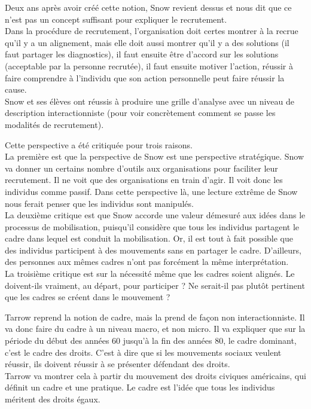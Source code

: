 \documentclass[10pt, a4paper, openany]{book}
\begin{document}
Deux ans après avoir créé cette notion, Snow revient dessus et nous dit que ce n'est pas un concept suffisant pour expliquer le recrutement. \\
Dans la procédure de recrutement, l'organisation doit certes montrer à la recrue qu'il y a un alignement, mais elle doit aussi montrer qu'il y a des solutions (il faut partager les diagnostics), il faut ensuite être d'accord sur les solutions (acceptable par la personne recrutée), il faut ensuite motiver l'action, réussir à faire comprendre à l'individu que son action personnelle peut faire réussir la cause. \\
Snow et ses élèves ont réussis à produire une grille d'analyse avec un niveau de description interactionniste (pour voir concrètement comment se passe les modalités de recrutement).


Cette perspective a été critiquée pour trois raisons. \\
La première est que la perspective de Snow est une perspective stratégique. Snow va donner un certains nombre d'outils aux organisations pour faciliter leur recrutement. Il ne voit que des organisations en train d'agir. Il voit donc les individus comme passif. Dans cette perspective là, une lecture extrême de Snow nous ferait penser que les individus sont manipulés. \\
La deuxième critique est que Snow accorde une valeur démesuré aux idées dans le processus de mobilisation, puisqu'il considère que tous les individus partagent le cadre dans lequel est conduit la mobilisation. Or, il est tout à fait possible que des individus participent à des mouvements sans en partager le cadre. D'ailleurs, des personnes aux mêmes cadres n'ont pas forcément la même interprétation. \\
La troisième critique est sur la nécessité même que les cadres soient alignés. Le doivent-ils vraiment, au départ, pour participer ? Ne serait-il pas plutôt pertinent que les cadres se créent dans le mouvement ? 


Tarrow reprend la notion de cadre, mais la prend de façon non interactionniste. Il va donc faire du cadre à un niveau macro, et non micro. Il va expliquer que sur la période du début des années 60 jusqu'à la fin des années 80, le cadre dominant, c'est le cadre des droits. C'est à dire que si les mouvements sociaux veulent réussir, ils doivent réussir à se présenter défendant des droits. \\
Tarrow va montrer cela à partir du mouvement des droits civiques américains, qui définit un cadre et une pratique. Le cadre est l'idée que tous les individus méritent des droits égaux. 
\end{document}
